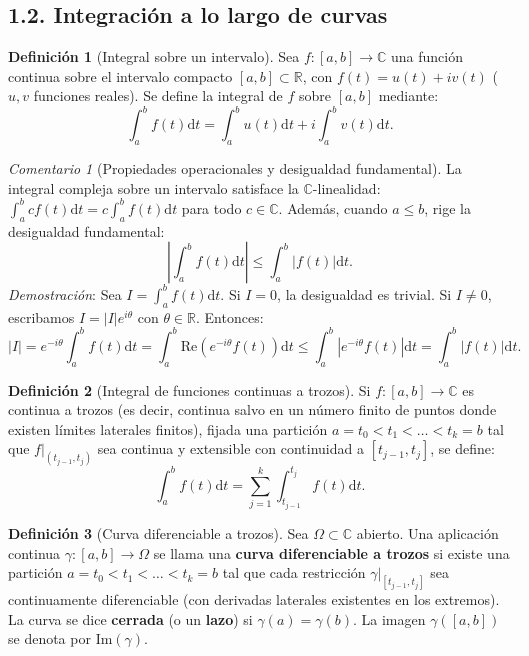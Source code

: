 \documentclass[11pt,a4paper]{article}
\theoremstyle{definition}
\newtheorem{definicion}{Definición}[section]
\theoremstyle{remark}
\newtheorem{observacion}{Comentario}[section]
\numberwithin{equation}{section}
\newcommand{\dt}{\mathrm{d}t}
\begin{document}
\subsection{1.2. Integración a lo largo de curvas}

\begin{definicion}[Integral sobre un intervalo]
Sea $f: [a,b] \to \mathbb{C}$ una función continua sobre el intervalo compacto $[a,b] \subset \mathbb{R}$, con $f(t) = u(t) + iv(t)$ ($u, v$ funciones reales). Se define la integral de $f$ sobre $[a,b]$ mediante:
\begin{equation}
\int_a^b f(t) \dt = \int_a^b u(t) \dt + i \int_a^b v(t) \dt.
\end{equation}
\end{definicion}

\begin{observacion}[Propiedades operacionales y desigualdad fundamental]
La integral compleja sobre un intervalo satisface la $\mathbb{C}$-linealidad: $\int_a^b c f(t) \dt = c \int_a^b f(t) \dt$ para todo $c \in \mathbb{C}$. Además, cuando $a \le b$, rige la desigualdad fundamental:
\begin{equation}
\left| \int_a^b f(t) \dt \right| \le \int_a^b |f(t)| \dt.
\end{equation}
\textit{Demostración}: Sea $I = \int_a^b f(t) \dt$. Si $I = 0$, la desigualdad es trivial. Si $I \neq 0$, escribamos $I = |I|e^{i\theta}$ con $\theta \in \mathbb{R}$. Entonces:
\[
|I| = e^{-i\theta} \int_a^b f(t) \dt = \int_a^b \mathrm{Re}\left(e^{-i\theta} f(t)\right) \dt \le \int_a^b \left|e^{-i\theta} f(t)\right| \dt = \int_a^b |f(t)| \dt.
\]
\end{observacion}

\begin{definicion}[Integral de funciones continuas a trozos]
Si $f: [a,b] \to \mathbb{C}$ es continua a trozos (es decir, continua salvo en un número finito de puntos donde existen límites laterales finitos), fijada una partición $a = t_0 < t_1 < \dots < t_k = b$ tal que $f|_{(t_{j-1}, t_j)}$ sea continua y extensible con continuidad a $[t_{j-1}, t_j]$, se define:
\begin{equation}
\int_a^b f(t) \dt = \sum_{j=1}^k \int_{t_{j-1}}^{t_j} f(t) \dt.
\end{equation}
\end{definicion}

\begin{definicion}[Curva diferenciable a trozos]
Sea $\Omega \subset \mathbb{C}$ abierto. Una aplicación continua $\gamma: [a,b] \to \Omega$ se llama una \textbf{curva diferenciable a trozos} si existe una partición $a = t_0 < t_1 < \dots < t_k = b$ tal que cada restricción $\gamma|_{[t_{j-1}, t_j]}$ sea continuamente diferenciable (con derivadas laterales existentes en los extremos). 
La curva se dice \textbf{cerrada} (o un \textbf{lazo}) si $\gamma(a) = \gamma(b)$. La imagen $\gamma([a,b])$ se denota por $\mathrm{Im}(\gamma)$.
\end{definicion}
\end{document}
